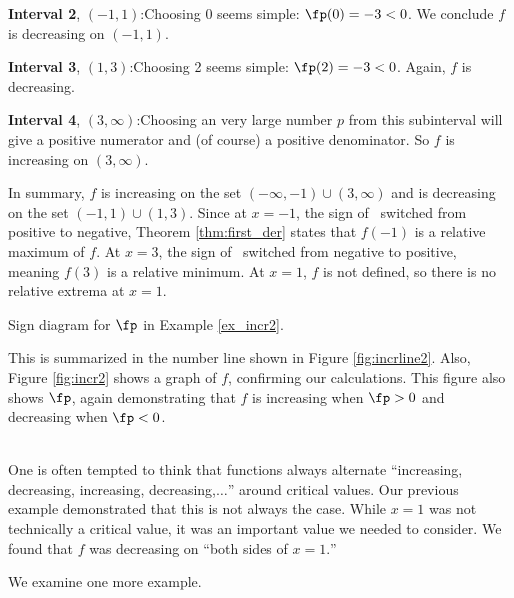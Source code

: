 {\noindent\textbf{Interval 2}, $(-1,1)$:\quad Choosing 0 seems simple: $\fp(0)=-3<0$. We conclude $f$ is decreasing on $(-1,1)$.

\noindent\textbf{Interval 3}, $(1,3)$:\quad Choosing 2 seems simple: $\fp(2) = -3<0$. Again, $f$ is decreasing.

\noindent \textbf{Interval 4}, $(3,\infty)$:\quad	Choosing an very large number $p$ from this subinterval will give a positive numerator and (of course) a positive denominator. So $f$ is increasing on $(3,\infty)$.

In summary, $f$ is increasing on the set $(-\infty,-1)\cup (3,\infty)$ and is decreasing on the set $(-1,1)\cup (1,3)$. Since at $x=-1$, the sign of \fp\ switched from positive to negative, Theorem \ref{thm:first_der} states that $f(-1)$ is a relative maximum of $f$. At $x=3$, the sign of \fp\ switched from negative to positive, meaning $f(3)$ is a relative minimum. At $x=1$, $f$ is not defined, so there is no relative extrema at $x=1$.

\noindent\begin{minipage}{\textwidth}\centering
{}
\captionsetup{type=figure}%
\caption{Sign diagram for $\fp$ in Example \ref{ex_incr2}.}\label{fig:incrline2}
\end{minipage}
 
This is summarized in the number line shown in Figure \ref{fig:incrline2}. Also, Figure \ref{fig:incr2} shows a graph of $f$, confirming our calculations. This figure also shows $\fp$, again demonstrating that $f$ is increasing when $\fp>0$ and decreasing when $\fp<0$.
}\\

One is often tempted to think that functions always alternate ``increasing, decreasing, increasing, decreasing,$\ldots$'' around critical values. Our previous example demonstrated that this is not always the case. While $x=1$ was not technically a critical value, it was an important value we needed to consider. We found that $f$ was decreasing on ``both sides of $x=1.$''

We examine one more example.\\


